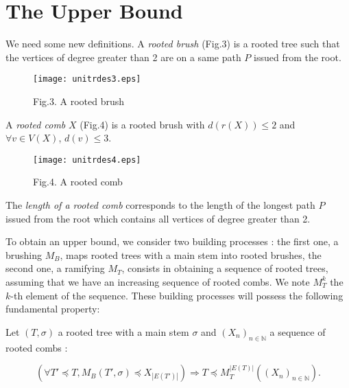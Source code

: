 \documentclass{llncs}
\begin{document}
\section{The Upper Bound}





We need some new definitions. A \textit{rooted brush} (Fig.3) is a
rooted tree such that the vertices of degree greater than 2 are on
a same path $P$ issued from the root.

\begin{figure}[htbp]
\centerline{\texttt{[image: unitrdes3.eps]}}
\label{fig3}
\begin{center}
Fig.3. A rooted brush
\end{center}
\end{figure}

A \textit{rooted comb} $X$ (Fig.4) is a rooted brush with $d\left(
{r\left( X \right)} \right) \le 2$ and $\forall v \in V\left( X
\right)$, $d\left( v \right) \le 3$.

\begin{figure}[htbp]
\centerline{\texttt{[image: unitrdes4.eps]}}
\label{fig4}
\begin{center}
Fig.4. A rooted comb
\end{center}
\end{figure}



The \textit{length of a rooted comb} corresponds to the length of the longest path $P$ issued from the root
which contains all vertices of degree greater than 2.





To obtain an upper bound, we consider two building processes : the
first one, a brushing $M_B $, maps rooted trees with a main stem
into rooted brushes, the second one, a ramifying $M_T $, consists
in obtaining a sequence of rooted trees, assuming that we have an
increasing sequence of rooted combs. We note $M_T^k $ the $k$-th
element of the sequence. These building processes will possess the
following fundamental property:





\begin{property} \label{pr1} Let $\left( {T,\sigma } \right)$ a rooted tree with a
main stem $\sigma $ and $\left( {X_n } \right)_{n \in \mathbb{N}}
$ a sequence of rooted combs :


\[
\left( {\forall {T}'\preceq T,M_B \left( {{T}',\sigma }
\right)\preceq X_{\left| {E\left( {T}' \right)} \right|} } \right)
\Rightarrow T\preceq M_T^{\left| {E\left( T \right)} \right|}
\left( {\left( {X_n } \right)_{n \in \mathbb{N}} } \right).
\]
\end{property}
\end{document}

